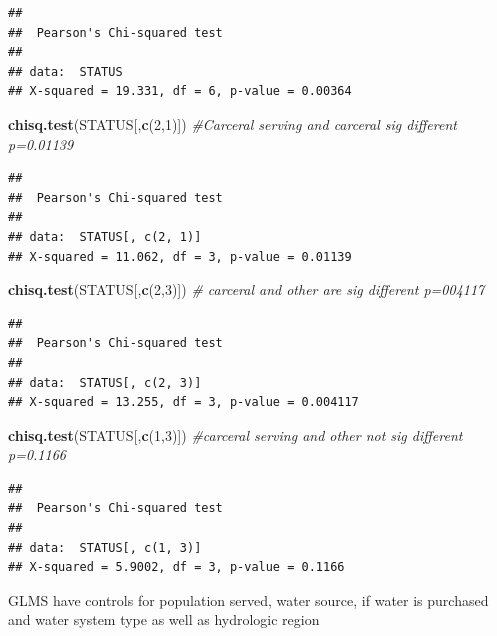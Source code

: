 \documentclass[
]{article}
\newenvironment{Shaded}{\begin{snugshade}}{\end{snugshade}}
\newcommand{\CommentTok}[1]{\textcolor[rgb]{0.56,0.35,0.01}{\textit{#1}}}
\newcommand{\DecValTok}[1]{\textcolor[rgb]{0.00,0.00,0.81}{#1}}
\newcommand{\FunctionTok}[1]{\textcolor[rgb]{0.13,0.29,0.53}{\textbf{#1}}}
\newcommand{\NormalTok}[1]{#1}
\begin{document}
\begin{verbatim}
## 
##  Pearson's Chi-squared test
## 
## data:  STATUS
## X-squared = 19.331, df = 6, p-value = 0.00364
\end{verbatim}

\begin{Shaded}
\begin{Highlighting}[]
\FunctionTok{chisq.test}\NormalTok{(STATUS[,}\FunctionTok{c}\NormalTok{(}\DecValTok{2}\NormalTok{,}\DecValTok{1}\NormalTok{)]) }\CommentTok{\#Carceral serving and carceral sig different p=0.01139}
\end{Highlighting}
\end{Shaded}

\begin{verbatim}
## 
##  Pearson's Chi-squared test
## 
## data:  STATUS[, c(2, 1)]
## X-squared = 11.062, df = 3, p-value = 0.01139
\end{verbatim}

\begin{Shaded}
\begin{Highlighting}[]
\FunctionTok{chisq.test}\NormalTok{(STATUS[,}\FunctionTok{c}\NormalTok{(}\DecValTok{2}\NormalTok{,}\DecValTok{3}\NormalTok{)]) }\CommentTok{\# carceral and other are sig different p=004117}
\end{Highlighting}
\end{Shaded}

\begin{verbatim}
## 
##  Pearson's Chi-squared test
## 
## data:  STATUS[, c(2, 3)]
## X-squared = 13.255, df = 3, p-value = 0.004117
\end{verbatim}

\begin{Shaded}
\begin{Highlighting}[]
\FunctionTok{chisq.test}\NormalTok{(STATUS[,}\FunctionTok{c}\NormalTok{(}\DecValTok{1}\NormalTok{,}\DecValTok{3}\NormalTok{)]) }\CommentTok{\#carceral serving and other not sig different p=0.1166}
\end{Highlighting}
\end{Shaded}

\begin{verbatim}
## 
##  Pearson's Chi-squared test
## 
## data:  STATUS[, c(1, 3)]
## X-squared = 5.9002, df = 3, p-value = 0.1166
\end{verbatim}

GLMS have controls for population served, water source, if water is
purchased and water system type as well as hydrologic region
\end{document}
